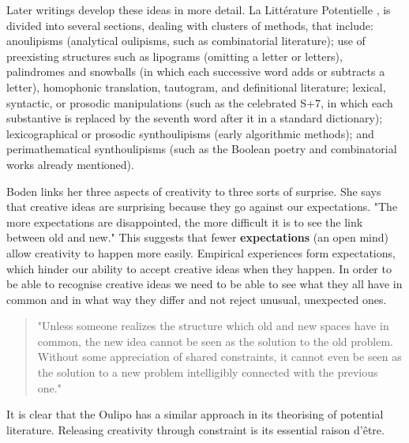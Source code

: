Later writings develop these ideas in more detail. La Littérature Potentielle \citep{Oulipo1973}, is divided into several sections, dealing with clusters of methods, that include: anoulipisms (analytical oulipisms, such as combinatorial literature); use of preexisting structures such as lipograms (omitting a letter or letters), palindromes and snowballs (in which each successive word adds or subtracts a letter), homophonic translation, tautogram, and definitional literature; lexical, syntactic, or prosodic manipulations (such as the celebrated S+7, in which each substantive is replaced by the seventh word after it in a standard dictionary); lexicographical or prosodic synthoulipisms (early algorithmic methods); and perimathematical synthoulipisms (such as the Boolean poetry and combinatorial works already mentioned).

Boden links her three aspects of creativity to three sorts of surprise. She says that creative ideas are surprising because they go against our expectations. "The more expectations are disappointed, the more difficult it is to see the link between old and new." \citep[p.84]{Boden2003} This suggests that fewer \textbf{expectations} (an open mind) allow creativity to happen more easily. Empirical experiences form expectations, which hinder our ability to accept creative ideas when they happen. In order to be able to recognise creative ideas we need to be able to see what they all have in common and in what way they differ and not reject unusual, unexpected ones.

\begin{quote}
"Unless someone realizes the structure which old and new spaces have in common, the new idea cannot be seen as the solution to the old problem. Without some appreciation of shared constraints, it cannot even be seen as the solution to a new problem intelligibly connected with the previous one." \citep[p.84]{Boden2003}
\end{quote}

It is clear that the Oulipo has a similar approach in its theorising of potential literature. Releasing creativity through constraint is its essential raison d'être.

